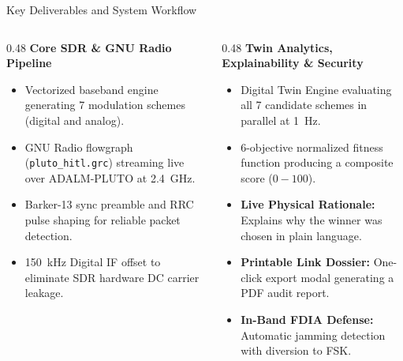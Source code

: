 \documentclass[aspectratio=169, 10pt]{beamer}
\begin{document}
\begin{frame}{Key Deliverables and System Workflow}
  \begin{columns}[T]
    \begin{column}{0.48\linewidth}
      \textbf{\color{primaryblue}\normalsize Core SDR \& GNU Radio Pipeline}\\[0.15cm]
      \begin{itemize}\setlength{\itemsep}{7pt}\small
        \item Vectorized baseband engine generating 7 modulation schemes (digital and analog).
        \item GNU Radio flowgraph (\texttt{pluto\_hitl.grc}) streaming live over ADALM-PLUTO at 2.4~GHz.
        \item Barker-13 sync preamble and RRC pulse shaping for reliable packet detection.
        \item 150~kHz Digital IF offset to eliminate SDR hardware DC carrier leakage.
      \end{itemize}
    \end{column}
    
    \begin{column}{0.48\linewidth}
      \textbf{\color{primaryblue}\normalsize Twin Analytics, Explainability \& Security}\\[0.15cm]
      \begin{itemize}\setlength{\itemsep}{7pt}\small
        \item Digital Twin Engine evaluating all 7 candidate schemes in parallel at 1~Hz.
        \item 6-objective normalized fitness function producing a composite score ($0-100$).
        \item \textbf{Live Physical Rationale:} Explains why the winner was chosen in plain language.
        \item \textbf{Printable Link Dossier:} One-click export modal generating a PDF audit report.
        \item \textbf{In-Band FDIA Defense:} Automatic jamming detection with diversion to FSK.
      \end{itemize}
    \end{column}
  \end{columns}
  

\end{frame}
\end{document}
